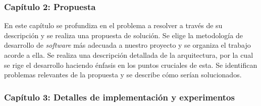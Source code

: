 \subsubsection*{Capítulo 2: Propuesta}
En este capítulo se profundiza en el problema a resolver a través de su descripción y se realiza una propuesta de solución. Se elige la metodología de desarrollo de \textit{software} más adecuada a nuestro proyecto y se organiza el trabajo acorde a ella. Se realiza una descripción detallada de la arquitectura, por la cual se rige el desarrollo haciendo énfasis en los puntos cruciales de esta. Se identifican problemas relevantes de la propuesta y se describe cómo serían solucionados.


%
%
 


\subsubsection*{Capítulo 3: Detalles de implementación y experimentos}

